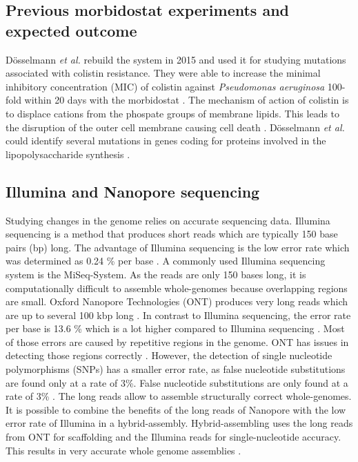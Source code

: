 \subsection{Previous morbidostat experiments and expected outcome}
Dösselmann \textit{et al.} rebuild the system in 2015  \cite{doselmann_rapid_2017} and used it for studying mutations associated with colistin resistance. They were able to increase the minimal inhibitory concentration (MIC) of colistin against \textit{Pseudomonas aeruginosa} 100-fold within 20 days with the morbidostat \cite{doselmann_rapid_2017}. The mechanism of action of colistin is to displace cations from the phospate groups of membrane lipids. This leads to the disruption of the outer cell membrane causing cell death \cite{noauthor_colistin:_nodate}. Dösselmann \textit{et al.} could identify several mutations in genes coding for proteins involved in the lipopolysaccharide synthesis \cite{doselmann_rapid_2017}.

\subsection{Illumina and Nanopore sequencing}
Studying changes in the genome relies on accurate sequencing data. Illumina sequencing is a method that produces short reads which are typically 150 base pairs (bp) long. The advantage of Illumina sequencing is the low error rate which was determined as 0.24 \% per base \cite{pfeiffer_systematic_2018}. A commonly used Illumina sequencing system is the MiSeq-System. As the reads are only 150 bases long, it is computationally difficult to assemble whole-genomes because overlapping regions are small.  
Oxford Nanopore Technologies (ONT) produces very long reads which are up to several 100 kbp long \cite{noauthor_resolving_nodate}. In contrast to Illumina sequencing, the error rate per base is 13.6 \% which is a lot higher compared to Illumina sequencing \cite{noauthor_resolving_nodate}. Most of those errors are caused by repetitive regions in the genome. ONT has issues in detecting those regions correctly \cite{noauthor_resolving_nodate}. However, the detection of single nucleotide polymorphisms (SNPs) has a smaller error rate, as false nucleotide substitutions are found only at a rate of 3\%. False nucleotide substitutions are only found at a rate of 3\% \cite{noauthor_resolving_nodate}. The long reads allow to assemble structurally correct whole-genomes. \\
It is possible to combine the benefits of the long reads of Nanopore with the low error rate of Illumina in a hybrid-assembly. Hybrid-assembling uses the long reads from ONT for scaffolding and the Illumina reads for single-nucleotide accuracy. This results in very accurate whole genome assemblies \cite{noauthor_resolving_nodate}.


